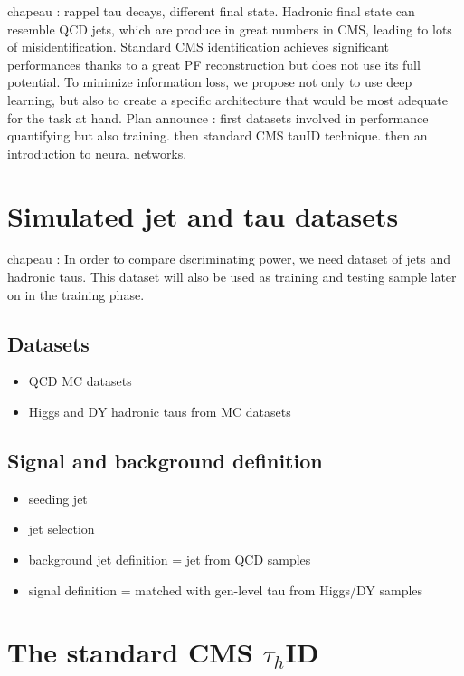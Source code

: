 chapeau : rappel tau decays, different final state. Hadronic final state can resemble QCD jets, which are produce in great numbers in CMS, leading to lots of misidentification. Standard CMS identification achieves significant performances thanks to a great PF reconstruction but does not use its full potential. To minimize information loss, we propose not only to use deep learning, but also to create a specific architecture that would be most adequate for the task at hand. Plan announce : first datasets involved in performance quantifying but also training. then standard CMS tauID technique. then an introduction to neural networks.

\section{Simulated jet and tau datasets}
chapeau : In order to compare dscriminating power, we need dataset of jets and hadronic taus. This dataset will also be used as training and testing sample later on in the training phase.

\subsection{Datasets}

\begin{itemize}
    \item QCD MC datasets
    \item Higgs and DY hadronic taus from MC datasets
\end{itemize}

\subsection{Signal and background definition}

\begin{itemize}
    \item seeding jet
    \item jet selection
    \item background jet definition = jet from QCD samples
    \item signal definition = matched with gen-level tau from Higgs/DY samples
\end{itemize}

\section{The standard CMS $\tau_{h}$ID}

